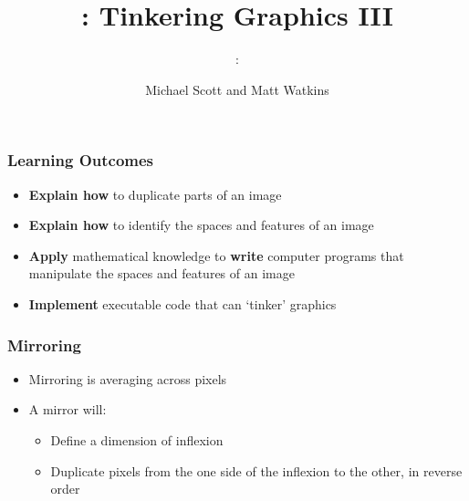 \usepackage{../../beamerthemeFalmouthGamesAcademy}
\usepackage{multimedia}
\graphicspath{ {../../} }


\usepackage[normalem]{ulem}
\usepackage{wasysym}

\usepackage{pdfpages}

\usetikzlibrary{arrows,automata}





\title{\sessionnumber: Tinkering Graphics III}
\subtitle{\modulecode: \moduletitle}
\author{Michael Scott and Matt Watkins}

\frame{\titlepage} 

\begin{frame}
	\frametitle{Learning Outcomes}
	\begin{itemize}
		\item \textbf{Explain how} to duplicate parts of an image
		\item \textbf{Explain how} to identify the spaces and features of an image
		\item \textbf{Apply} mathematical knowledge to \textbf{write} computer programs that manipulate the spaces and features of an image
		\item \textbf{Implement} executable code that can `tinker' graphics
	\end{itemize}
\end{frame}


\begin{frame}
	\frametitle{Mirroring}
	
	\begin{itemize}		
		\item Mirroring is averaging across pixels
		\item A mirror will:
		\begin{itemize}
			\item Define a dimension of inflexion
			\item Duplicate pixels from the one side of the inflexion to the other, in reverse order
		\end{itemize}	
	\end{itemize}
\end{frame}

